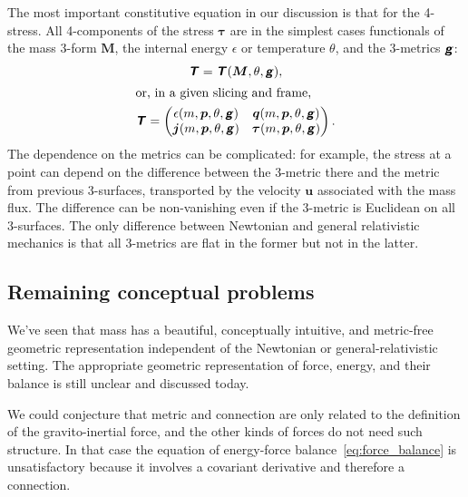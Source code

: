 \documentclass[\ifafour a4paper,12pt,\else a5paper,10pt,\fi%
onecolumn,oneside,article,%
british%
]{memoir}
\theoremstyle{remark}
\theoremstyle{innote}
\newcommand*{\mathte}[1]{\textbf{\textit{\textsf{#1}}}}
\newcommand*{\citep}{\parencites}
\renewcommand*{\|}{\nonscript\,\vert\nonscript\;\mathopen{}}
\newcommand*{\ydd}{m}
\newcommand*{\yd}{\ydd}
\newcommand*{\yrr}{M}
\newcommand*{\yr}{\bm{\yrr}}
\newcommand*{\ycc}{u}
\newcommand*{\yc}{\bm{\ycc}}
\newcommand*{\yjj}{p}
\newcommand*{\yj}{\bm{\yjj}}
\newcommand*{\yqq}{q}
\newcommand*{\yq}{\bm{\yqq}}
\newcommand*{\yTT}{\tau}
\newcommand*{\yT}{\bm{\yTT}}
\newcommand*{\yTTf}{T}
\newcommand*{\yTf}{\mathte{\yTTf}}
\newcommand*{\ygg}{g}
\newcommand*{\yg}{\mathte{\ygg}}
\newcommand*{\ypp}{j}
\newcommand*{\yp}{\bm{\ypp}}
\newcommand*{\ye}{\epsilon}
\newcommand*{\yte}{\theta}
\begin{document}
The most important constitutive equation in our discussion is that for the
4-stress. All 4-components of the stress $\yT$ are in the simplest cases
functionals of the mass 3-form $\yr$, the internal energy $\ye$ or
temperature $\yte$, and the 3-metrics $\yg$:
\begin{subequations}\label{eq:constitutive_4stress}
  \begin{gather}
    \label{eq:constit_T_with_mass_geometry}
    \yTf=\yTf(\yr,\yte,\yg),
    \\
    \shortintertext{or, in a given slicing and frame,}
    \label{eq:4stress_components}
    \yTf =
    \begin{pmatrix}
      \ye(\yd,\yj,\yte,\yg) & \yq(\yd,\yj,\yte,\yg) \\
      \yp(\yd,\yj,\yte,\yg) & \yT(\yd,\yj,\yte,\yg)
    \end{pmatrix}.
  \end{gather}
\end{subequations}
The dependence on the metrics can be complicated: for example, the stress
at a point can depend on the difference between the 3-metric there and the
metric from previous 3-surfaces, transported by the velocity $\yc$
associated with the mass flux\citep{grotetal1966,carteretal1972}. The
difference can be non-vanishing even if the 3-metric is Euclidean on all
3-surfaces. The only difference between Newtonian and general relativistic
mechanics is that all 3-metrics are flat in the former but not in the
latter.

\subsection{Remaining conceptual problems}
\label{sec:conceptual_problems_stress}

We've seen that mass has a beautiful, conceptually intuitive, and
metric-free geometric representation independent of the Newtonian or
general-relativistic setting. The appropriate geometric representation of
force, energy, and their balance is still unclear and discussed today.

We could conjecture that metric and connection are only related to the
definition of the gravito-inertial force, and the other kinds of forces do
not need such structure. In that case the equation of
energy-force balance~\eqref{eq:force_balance} is unsatisfactory because it
involves a covariant derivative and therefore a connection.
\end{document}
